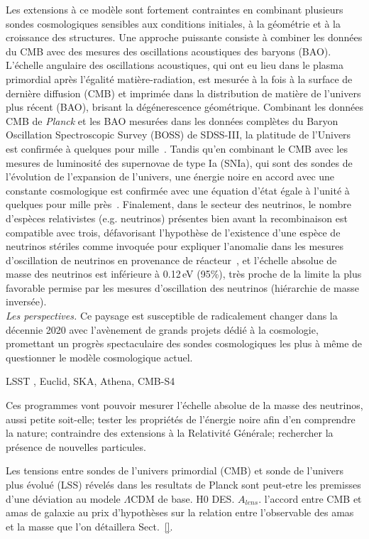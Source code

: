 Les extensions à ce modèle sont fortement contraintes en combinant
plusieurs sondes cosmologiques sensibles aux conditions initiales, à
la géométrie et à la croissance des structures. 
Une approche puissante consiste à combiner les données du CMB avec des mesures des
oscillations acoustiques des baryons (BAO). L'échelle angulaire des
oscillations acoustiques, qui ont eu lieu dans
le plasma primordial après l'égalité matière-radiation, est mesurée à
la fois à la surface de dernière diffusion (CMB) et imprimée dans la
distribution de matière de l'univers plus récent (BAO), brisant la
dégénerescence géométrique. Combinant les
données CMB de \emph{Planck} et les BAO mesurées dans les données
complètes du Baryon Oscillation Spectroscopic Survey (BOSS) de
SDSS-III, la platitude de l'Univers est confirmée à quelques pour
mille~\citep{BOSS2017, Planck2018_cosmo}. Tandis qu'en
combinant le CMB avec les mesures de luminosité des supernovae de type
Ia (SNIa), qui sont des sondes de l'évolution de l'expansion de
l'univers, une énergie noire en accord avec une constante cosmologique
est confirmée avec une équation d'état égale à l'unité à quelques pour
mille près~\citep{SNLS2014, PANSTARR2018, Planck2018_cosmo}.
Finalement, dans le secteur des neutrinos, le nombre
d'espèces relativistes (e.g. neutrinos) présentes bien avant la
recombinaison est compatible avec trois, défavorisant l'hypothèse de
l'existence d'une espèce de neutrinos stériles comme invoquée pour expliquer
l'anomalie dans les mesures d'oscillation de neutrinos en provenance
de réacteur~\citep{LSND2001, STEREO2019}, et l'échelle absolue de masse des
neutrinos est inférieure à 0.12\,eV (95\%), très proche de la limite
la plus favorable permise par les mesures d'oscillation des neutrinos
(hiérarchie de masse inversée).\\


\emph{Les perspectives.}
Ce paysage est susceptible de radicalement changer dans la décennie
2020 avec l'avènement de grands projets dédié à la cosmologie,
promettant un progrès spectaculaire des sondes cosmologiques les plus
à même de questionner le modèle cosmologique actuel. 

LSST , Euclid, SKA, Athena, CMB-S4

Ces programmes vont pouvoir mesurer l'échelle absolue de la masse des
neutrinos, aussi petite soit-elle; tester les propriétés de l'énergie
noire afin d'en comprendre la nature; contraindre des extensions à la
Relativité Générale; rechercher la présence de nouvelles particules.

Les tensions entre sondes de l'univers primordial (CMB) et sonde de
l'univers plus évolué (LSS) révelés dans les resultats de Planck sont
peut-etre les premisses d'une déviation au modele $\Lambda$CDM de
base. H0 DES. $A_{lens}$. l'accord entre CMB et amas de galaxie au prix
d'hypothèses sur la relation entre l'observable des amas et la
masse que l'on détaillera Sect.~\ref{}.

